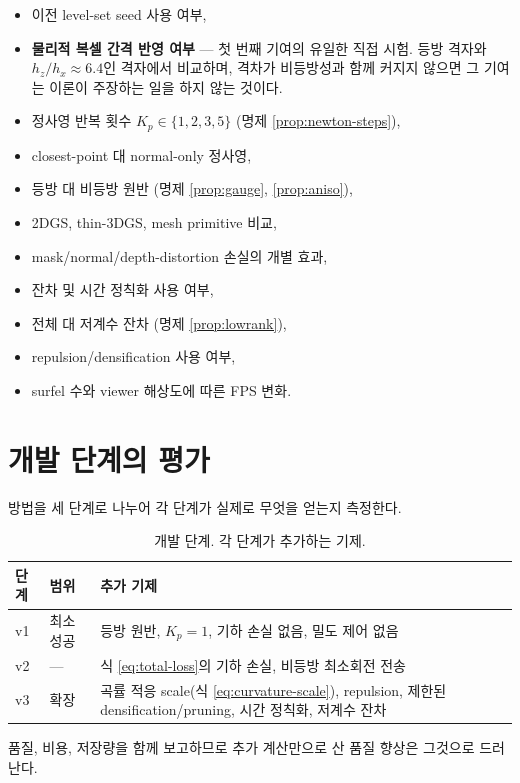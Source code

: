 \begin{itemize}[leftmargin=2em]
  \item 이전 level-set seed 사용 여부,
  \item \textbf{물리적 복셀 간격 반영 여부} --- 첫 번째 기여의 유일한 직접 시험. 등방
  격자와 $h_z/h_x\approx6.4$인 격자에서 비교하며, 격차가 비등방성과 함께 커지지 않으면
  그 기여는 이론이 주장하는 일을 하지 않는 것이다.
  \item 정사영 반복 횟수 $K_p\in\{1,2,3,5\}$ (명제 \ref{prop:newton-steps}),
  \item closest-point 대 normal-only 정사영,
  \item 등방 대 비등방 원반 (명제 \ref{prop:gauge}, \ref{prop:aniso}),
  \item 2DGS, thin-3DGS, mesh primitive 비교,
  \item mask/normal/depth-distortion 손실의 개별 효과,
  \item 잔차 및 시간 정칙화 사용 여부,
  \item 전체 대 저계수 잔차 (명제 \ref{prop:lowrank}),
  \item repulsion/densification 사용 여부,
  \item surfel 수와 viewer 해상도에 따른 FPS 변화.
\end{itemize}

\section{개발 단계의 평가}

방법을 세 단계로 나누어 각 단계가 실제로 무엇을 얻는지 측정한다.

\begin{table}[htbp]
\centering
\small
\caption{개발 단계. 각 단계가 추가하는 기제.}
\label{tab:stages}
\begin{tabular}{@{}llp{7.2cm}@{}}
\toprule
단계 & 범위 & 추가 기제 \\
\midrule
v1 & 최소 성공 & 등방 원반, $K_p=1$, 기하 손실 없음, 밀도 제어 없음 \\
v2 & --- & 식 \eqref{eq:total-loss}의 기하 손실, 비등방 최소회전 전송 \\
v3 & 확장 & 곡률 적응 scale(식 \eqref{eq:curvature-scale}), repulsion, 제한된
  densification/pruning, 시간 정칙화, 저계수 잔차 \\
\bottomrule
\end{tabular}
\end{table}

품질, 비용, 저장량을 함께 보고하므로 추가 계산만으로 산 품질 향상은 그것으로 드러난다.

